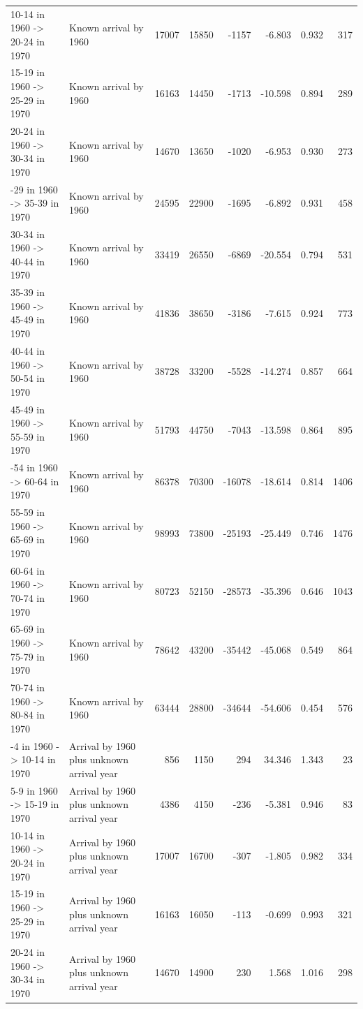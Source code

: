 \begin{table}
\begin{tabular}[t]{llrrrrrr}
10-14 in 1960 -> 20-24 in 1970 & Known arrival by 1960 & 17007 & 15850 & -1157 & -6.803 & 0.932 & 317\\
15-19 in 1960 -> 25-29 in 1970 & Known arrival by 1960 & 16163 & 14450 & -1713 & -10.598 & 0.894 & 289\\
20-24 in 1960 -> 30-34 in 1970 & Known arrival by 1960 & 14670 & 13650 & -1020 & -6.953 & 0.930 & 273\\
\addlinespace
25-29 in 1960 -> 35-39 in 1970 & Known arrival by 1960 & 24595 & 22900 & -1695 & -6.892 & 0.931 & 458\\
30-34 in 1960 -> 40-44 in 1970 & Known arrival by 1960 & 33419 & 26550 & -6869 & -20.554 & 0.794 & 531\\
35-39 in 1960 -> 45-49 in 1970 & Known arrival by 1960 & 41836 & 38650 & -3186 & -7.615 & 0.924 & 773\\
40-44 in 1960 -> 50-54 in 1970 & Known arrival by 1960 & 38728 & 33200 & -5528 & -14.274 & 0.857 & 664\\
45-49 in 1960 -> 55-59 in 1970 & Known arrival by 1960 & 51793 & 44750 & -7043 & -13.598 & 0.864 & 895\\
\addlinespace
50-54 in 1960 -> 60-64 in 1970 & Known arrival by 1960 & 86378 & 70300 & -16078 & -18.614 & 0.814 & 1406\\
55-59 in 1960 -> 65-69 in 1970 & Known arrival by 1960 & 98993 & 73800 & -25193 & -25.449 & 0.746 & 1476\\
60-64 in 1960 -> 70-74 in 1970 & Known arrival by 1960 & 80723 & 52150 & -28573 & -35.396 & 0.646 & 1043\\
65-69 in 1960 -> 75-79 in 1970 & Known arrival by 1960 & 78642 & 43200 & -35442 & -45.068 & 0.549 & 864\\
70-74 in 1960 -> 80-84 in 1970 & Known arrival by 1960 & 63444 & 28800 & -34644 & -54.606 & 0.454 & 576\\
\addlinespace
0-4 in 1960 -> 10-14 in 1970 & Arrival by 1960 plus unknown arrival year & 856 & 1150 & 294 & 34.346 & 1.343 & 23\\
5-9 in 1960 -> 15-19 in 1970 & Arrival by 1960 plus unknown arrival year & 4386 & 4150 & -236 & -5.381 & 0.946 & 83\\
10-14 in 1960 -> 20-24 in 1970 & Arrival by 1960 plus unknown arrival year & 17007 & 16700 & -307 & -1.805 & 0.982 & 334\\
15-19 in 1960 -> 25-29 in 1970 & Arrival by 1960 plus unknown arrival year & 16163 & 16050 & -113 & -0.699 & 0.993 & 321\\
20-24 in 1960 -> 30-34 in 1970 & Arrival by 1960 plus unknown arrival year & 14670 & 14900 & 230 & 1.568 & 1.016 & 298\\

\end{tabular}
\end{table}
